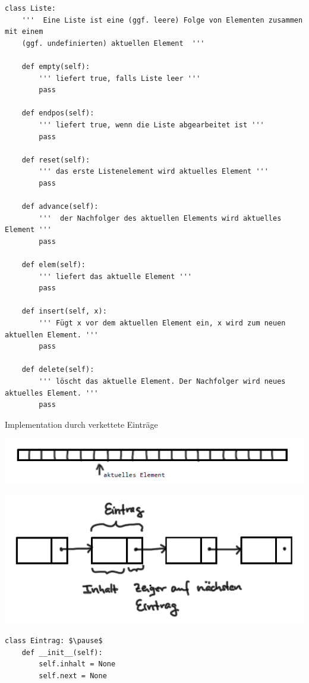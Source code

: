 \documentclass{beamer}
\begin{document}

\begin{frame}[fragile]
\footnotesize 
\begin{lstlisting} 
class Liste:
    '''  Eine Liste ist eine (ggf. leere) Folge von Elementen zusammen mit einem
    (ggf. undefinierten) aktuellen Element  '''
    
    def empty(self):
        ''' liefert true, falls Liste leer '''
        pass
        
    def endpos(self):
        ''' liefert true, wenn die Liste abgearbeitet ist '''
        pass

    def reset(self):
        ''' das erste Listenelement wird aktuelles Element '''
        pass
    
    def advance(self):
        '''  der Nachfolger des aktuellen Elements wird aktuelles Element '''
        pass

    def elem(self):
        ''' liefert das aktuelle Element '''
        pass
  
    def insert(self, x):
        ''' Fügt x vor dem aktuellen Element ein, x wird zum neuen aktuellen Element. '''
        pass

    def delete(self):
        ''' löscht das aktuelle Element. Der Nachfolger wird neues aktuelles Element. '''
        pass

\end{lstlisting} 
\end{frame}


\begin{frame}[fragile]


Implementation durch verkettete Einträge    

\includegraphics[scale=0.6]{bild1.png}  

\includegraphics[scale=0.6]{bild2.png}  

\footnotesize 
\begin{lstlisting} 
class Eintrag: $\pause$
    def __init__(self):
        self.inhalt = None
        self.next = None
\end{lstlisting}

\end{frame}
\end{document}
